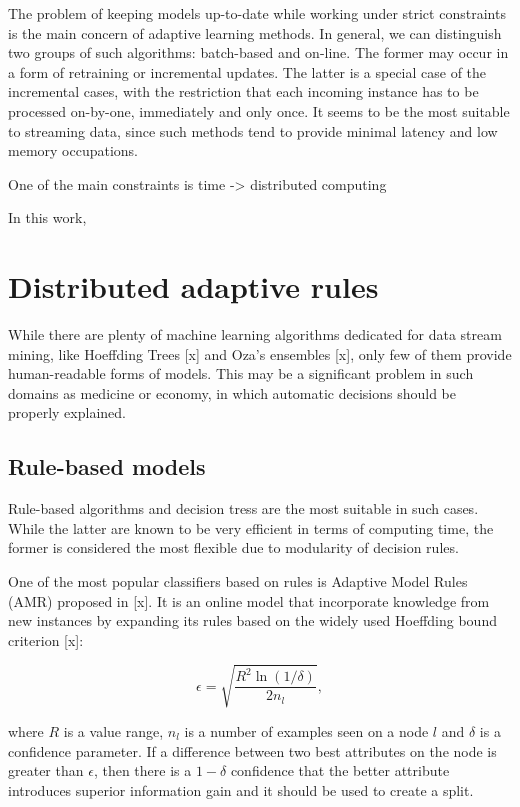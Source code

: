 \documentclass[journal]{IEEEtran}
\begin{document}
The problem of keeping models up-to-date while working under strict constraints is the main concern of adaptive learning methods. In general, we can distinguish two groups of such algorithms: batch-based and on-line. The former may occur in a form of retraining or incremental updates. The latter is a special case of the incremental cases, with the restriction that each incoming instance has to be processed on-by-one, immediately and only once. It seems to be the most suitable to streaming data, since such methods tend to provide minimal latency and low memory occupations.

One of the main constraints is time -> distributed computing

In this work,

\section{Distributed adaptive rules}

While there are plenty of machine learning algorithms dedicated for data stream mining, like Hoeffding Trees [x] and Oza's ensembles [x], only few of them provide human-readable forms of models. This may be a significant problem in such domains as medicine or economy, in which automatic decisions should be properly explained.

\subsection{Rule-based models}
Rule-based algorithms and decision tress are the most suitable in such cases. While the latter are known to be very efficient in terms of computing time, the former is considered the most flexible due to modularity of decision rules.

One of the most popular classifiers based on rules is Adaptive Model Rules (AMR) proposed in [x]. It is an online model that incorporate knowledge from new instances by expanding its rules based on the widely used Hoeffding bound criterion [x]:

\begin{equation}
\label{eq:hbound}
\epsilon = \sqrt{\frac{R^2\ln(1/\delta)}{2n_l}},
\end{equation} 

\noindent where $R$ is a value range, $n_l$ is a number of examples seen on a node $l$ and $\delta$ is a confidence parameter. If a difference between two best attributes on the node is greater than $\epsilon$, then there is a $1-\delta$ confidence that the better attribute introduces superior information gain and it should be used to create a split.
\end{document}
